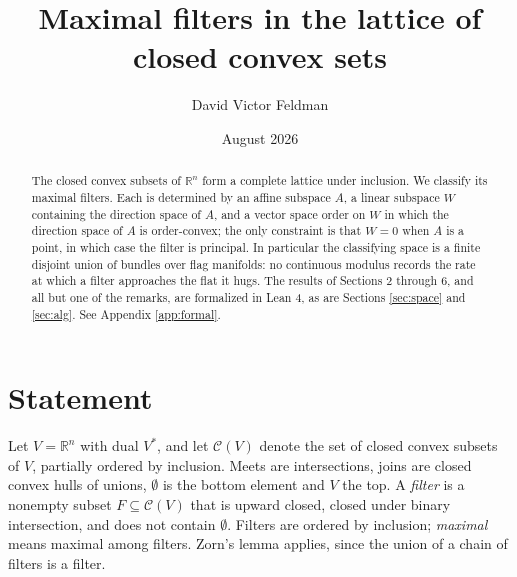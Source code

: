 \documentclass[11pt]{amsart}
\theoremstyle{plain}
\theoremstyle{definition}
\newcommand{\CC}{\mathscr{C}}
\newcommand{\RR}{\mathbb{R}}
\newcommand{\Vs}{V^{*}}
\begin{document}
\title[Maximal filters of closed convex sets]{Maximal filters in the lattice of closed convex sets}

\author{David Victor Feldman}
\address{Department of Mathematics and Statistics, University of New Hampshire, Durham, NH 03824, USA}



\date{August 2026}

\begin{abstract}
The closed convex subsets of $\RR^n$ form a complete lattice under inclusion. We classify its maximal filters. Each is determined by an affine subspace $A$, a linear subspace $W$ containing the direction space of $A$, and a vector space order on $W$ in which the direction space of $A$ is order-convex; the only constraint is that $W=0$ when $A$ is a point, in which case the filter is principal. In particular the classifying space is a finite disjoint union of bundles over flag manifolds: no continuous modulus records the rate at which a filter approaches the flat it hugs. The results of Sections 2 through 6, and all but one of the remarks, are formalized in Lean 4, as are Sections \ref{sec:space} and \ref{sec:alg}. See Appendix \ref{app:formal}.
\end{abstract}

\maketitle

\section{Statement}

Let $V=\RR^n$ with dual $\Vs$, and let $\CC(V)$ denote the set of closed convex subsets of $V$, partially ordered by inclusion. Meets are intersections, joins are closed convex hulls of unions, $\emptyset$ is the bottom element and $V$ the top. A \emph{filter} is a nonempty subset $F\subseteq\CC(V)$ that is upward closed, closed under binary intersection, and does not contain $\emptyset$. Filters are ordered by inclusion; \emph{maximal} means maximal among filters. Zorn's lemma applies, since the union of a chain of filters is a filter.
\end{document}
